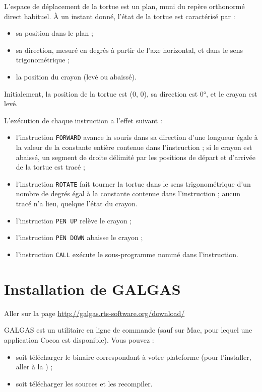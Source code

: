 
L'espace de déplacement de la tortue est un plan, muni du repère orthonormé direct habituel. À un instant donné, l'état de la tortue est caractérisé par :
\begin{itemize}
  \item sa position dans le plan ;
  \item sa direction, mesuré en degrés à partir de l'axe horizontal, et dans le sens trigonométrique ;
  \item la position du crayon (levé ou abaissé).
\end{itemize}

Initialement, la position de la tortue est (0, 0), sa direction est 0°, et le crayon est levé.

L'exécution de chaque instruction a l'effet suivant :
\begin{itemize}
  \item l'instruction \texttt{FORWARD} avance la souris dans sa direction d'une longueur égale à la valeur de la constante entière contenue dans l'instruction ; si le crayon est abaissé, un segment de droite délimité par les positions de départ et d'arrivée de la tortue est tracé ;
  \item l'instruction \texttt{ROTATE} fait tourner la tortue dans le sens trigonométrique d'un nombre de degrés égal à la constante contenue dans l'instruction ; aucun tracé n'a lieu, quelque l'état du crayon.
  \item l'instruction \texttt{PEN UP} relève le crayon ;
  \item l'instruction \texttt{PEN DOWN} abaisse le crayon ;
  \item l'instruction \texttt{CALL} exécute le sous-programme nommé dans l'instruction.
\end{itemize}











\section{Installation de GALGAS}

Aller sur la page \url{http://galgas.rts-software.org/download/}

GALGAS est un utilitaire en ligne de commande (sauf sur Mac, pour lequel une application Cocoa est disponible). Vous pouvez :
\begin{itemize}
  \item soit télécharger le binaire correspondant à votre plateforme (pour l'installer, aller à la ) ;
  \item soit télécharger les sources et les recompiler.
\end{itemize}




